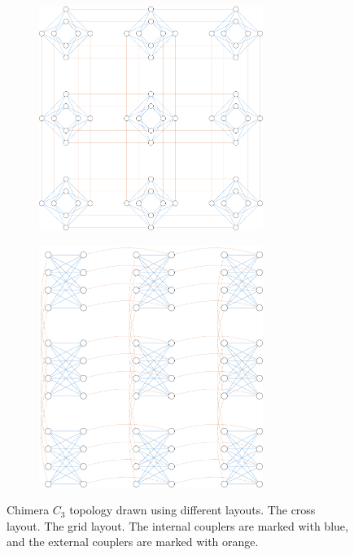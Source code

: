 \begin{figure}
  \begin{subfigure}[b]{0.5\textwidth}
    \centering
    \includegraphics[width=0.8\textwidth]{figures/chimera-cross.pdf}
    \caption{}\label{fig:chimera-cross}
  \end{subfigure}
  \begin{subfigure}[b]{0.45\textwidth}
    \centering
    \includegraphics[width=0.8\textwidth]{figures/chimera-shore-column.pdf}
    \caption{}\label{fig:chimera-shore-column}
  \end{subfigure}
  \caption{
    Chimera $C_3$ topology drawn using different layouts.
     The cross layout. 
    The grid layout. The internal couplers are marked with {\color{RoyalBlue} blue},
    and the external couplers are marked with {\color{Tan} orange}. }
  \label{fig:chimera}
\end{figure}

